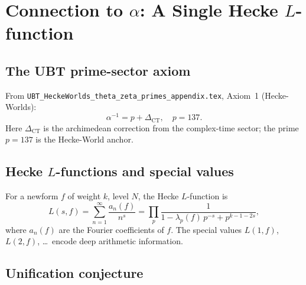 \documentclass[12pt,a4paper]{article}
\theoremstyle{remark}
\begin{document}
\section{Connection to $\alpha$: A Single Hecke $L$-function}
\label{sec:alpha_connection}

\subsection{The UBT prime-sector axiom}

From \texttt{UBT\_HeckeWorlds\_theta\_zeta\_primes\_appendix.tex},
Axiom~1 (Hecke-Worlds):
\begin{equation}
  \label{eq:alpha_axiom}
  \alpha^{-1} = p + \Delta_{\mathrm{CT}},
  \quad p = 137.
\end{equation}
Here $\Delta_{\mathrm{CT}}$ is the archimedean correction from the
complex-time sector; the prime $p=137$ is the Hecke-World anchor.

\subsection{Hecke $L$-functions and special values}

For a newform $f$ of weight $k$, level $N$, the Hecke $L$-function is
\begin{equation}
  \label{eq:hecke_L}
  L(s,f) = \sum_{n=1}^{\infty} \frac{a_n(f)}{n^s}
  = \prod_p \frac{1}{1 - \lambda_p(f)\,p^{-s} + p^{k-1-2s}},
\end{equation}
where $a_n(f)$ are the Fourier coefficients of $f$.
The special values $L(1,f)$, $L(2,f)$, \ldots\ encode deep arithmetic
information.

\subsection{Unification conjecture}
\end{document}
